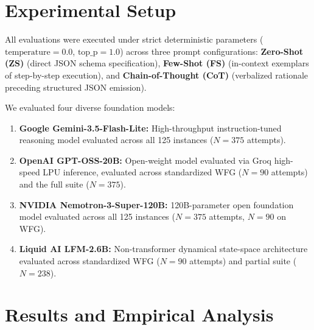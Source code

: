 \documentclass[conference]{IEEEtran}
\begin{document}
\section{Experimental Setup}
\label{sec:setup}

All evaluations were executed under strict deterministic parameters
($\text{temperature} = 0.0$, $\text{top\_p} = 1.0$) across three prompt configurations:
\textbf{Zero-Shot (ZS)} (direct JSON schema specification), \textbf{Few-Shot (FS)}
(in-context exemplars of step-by-step execution), and \textbf{Chain-of-Thought (CoT)}
(verbalized rationale preceding structured JSON emission).

We evaluated four diverse foundation models:
\begin{enumerate}
\item \textbf{Google Gemini-3.5-Flash-Lite:} High-throughput instruction-tuned
  reasoning model evaluated across all 125 instances ($N{=}375$ attempts).
\item \textbf{OpenAI GPT-OSS-20B:} Open-weight model evaluated via Groq high-speed LPU
  inference, evaluated across standardized WFG ($N{=}90$ attempts) and the full suite ($N{=}375$).
\item \textbf{NVIDIA Nemotron-3-Super-120B:} 120B-parameter open foundation model
  evaluated across all 125 instances ($N{=}375$ attempts, $N{=}90$ on WFG).
\item \textbf{Liquid AI LFM-2.6B:} Non-transformer dynamical state-space architecture
  evaluated across standardized WFG ($N{=}90$ attempts) and partial suite ($N{=}238$).
\end{enumerate}

\section{Results and Empirical Analysis}
\label{sec:results}
\end{document}
